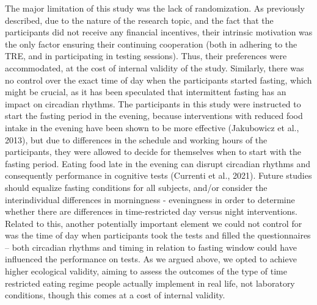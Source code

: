 \documentclass[authordate, empirical]{jote-new-article}
\begin{document}
The major limitation of this study was the lack of randomization. As previously described, due to the nature of the research topic, and the fact that the participants did not receive any financial incentives, their intrinsic motivation was the only factor ensuring their continuing cooperation (both in adhering to the TRE, and in participating in testing sessions). Thus, their preferences were accommodated, at the cost of internal validity of the study. Similarly, there was no control over the exact time of day when the participants started fasting, which might be crucial, as it has been speculated that intermittent fasting has an impact on circadian rhythms. The participants in this study were instructed to start the fasting period in the evening, because interventions with reduced food intake in the evening have been shown to be more effective (Jakubowicz et al., 2013), but due to differences in the schedule and working hours of the participants, they were allowed to decide for themselves when to start with the fasting period. Eating food late in the evening can disrupt circadian rhythms and consequently performance in cognitive tests (Currenti et al., 2021). Future studies should equalize fasting conditions for all subjects, and/or consider the interindividual differences in morningness - eveningness in order to determine whether there are differences in time-restricted day versus night interventions. Related to this, another potentially important element we could not control for was the time of day when participants took the tests and filled the questionnaires -- both circadian rhythms and timing in relation to fasting window could have influenced the performance on tests. As we argued above, we opted to achieve higher ecological validity, aiming to assess the outcomes of the type of time restricted eating regime people actually implement in real life, not laboratory conditions, though this comes at a cost of internal validity.
\end{document}
